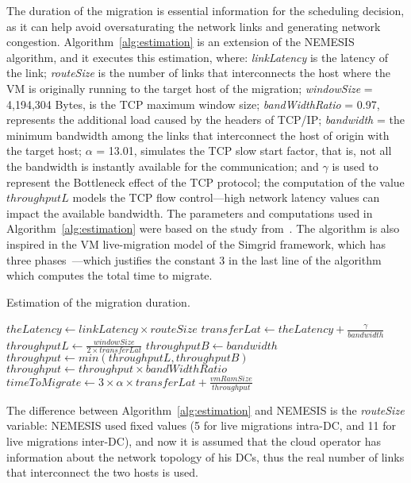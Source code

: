 The duration of the migration is essential information for the scheduling decision, as it can help avoid oversaturating the network links and generating network congestion. Algorithm~\ref{alg:estimation} is an extension of the NEMESIS algorithm, and it executes this estimation, where: \textit{linkLatency} is the latency of the link; \textit{routeSize} is the number of links that interconnects the host where the VM is originally running to the target host of the migration; \mbox{\textit{windowSize}} = 4,194,304 Bytes, is the TCP maximum window size; \textit{bandWidthRatio} = 0.97, represents the additional load caused by the headers of TCP/IP; \textit{bandwidth} = the minimum bandwidth among the links that interconnect the host of origin with the target host; $\alpha$ = 13.01, simulates the TCP slow start factor, that is, not all the bandwidth is instantly available for the communication; and $\gamma$ is used to represent the Bottleneck effect of the TCP protocol; the computation of the value $throughputL$ models the TCP flow control---high network latency values can impact the available bandwidth. The parameters and computations used in Algorithm~\ref{alg:estimation} were based on the study from~\citet{velho2013simgridparameters}. The algorithm is also inspired in the VM live-migration model of the Simgrid framework, which has three phases~\cite{simgrid_live_migration}---which justifies the constant 3 in the last line of the algorithm which computes the total time to migrate.

\begin{algorithm}[h]
\begin{algorithmic}
\caption{Estimation of the migration duration.}\label{alg:estimation}
\State $theLatency \gets linkLatency \times routeSize$
\State $transferLat \gets theLatency + \frac{\gamma}{bandwidth}$
\State $throughputL \gets \frac{windowSize}{2 \times transferLat}$
\State $throughputB \gets bandwidth$
\State $throughput \gets min(throughputL, throughputB)$
\State $throughput \gets throughput \times bandWidthRatio$
\State $timeToMigrate \gets  3 \times \alpha \times transferLat + \frac{vmRamSize}{throughput}$ 
\end{algorithmic}
\end{algorithm}


The difference between Algorithm~\ref{alg:estimation}  and NEMESIS is the \textit{routeSize} variable: NEMESIS used fixed values (5 for live migrations intra-DC, and 11 for live migrations inter-DC), and now it is assumed that the cloud operator has information about the network topology of his DCs, thus the real number of links that interconnect the two hosts is used.


